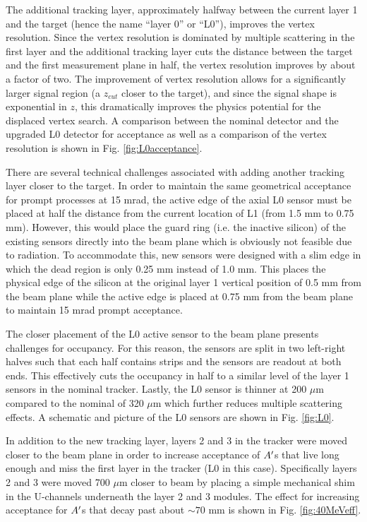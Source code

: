 The additional tracking layer, approximately halfway between the current layer 1 and the target (hence the name ``layer 0'' or ``L0''), improves the vertex resolution. Since the vertex resolution is dominated by multiple scattering in the first layer and the additional tracking layer cuts the distance between the target and the first measurement plane in half, the vertex resolution improves by about a factor of two. The improvement of vertex resolution allows for a significantly larger signal region (a $z_{cut}$ closer to the target), and since the signal shape is exponential in $z$, this dramatically improves the physics potential for the displaced vertex search. A comparison between the nominal detector and the upgraded L0 detector for acceptance as well as a comparison of the vertex resolution is shown in Fig. \ref{fig:L0acceptance}.

There are several technical challenges associated with adding another tracking layer closer to the target. In order to maintain the same geometrical acceptance for prompt processes at 15 mrad, the active edge of the axial L0 sensor must be placed at half the distance from the current location of L1 (from 1.5 mm to 0.75 mm). However, this would place the guard ring (i.e. the inactive silicon) of the existing sensors directly into the beam plane which is obviously not feasible due to radiation. To accommodate this, new sensors were designed with a slim edge in which the dead region is only 0.25 mm instead of 1.0 mm. This places the physical edge of the silicon at the original layer 1 vertical position of 0.5 mm from the beam plane while the active edge is placed at 0.75 mm from the beam plane to maintain 15 mrad prompt acceptance.

The closer placement of the L0 active sensor to the beam plane presents challenges for occupancy. For this reason, the sensors are split in two left-right halves such that each half contains strips and the sensors are readout at both ends. This effectively cuts the occupancy in half to a similar level of the layer 1 sensors in the nominal tracker. Lastly, the L0 sensor is thinner at 200 $\mu$m compared to the nominal of 320 $\mu$m which further reduces multiple scattering effects. A schematic and picture of the L0 sensors are shown in Fig. \ref{fig:L0}.

In addition to the new tracking layer, layers 2 and 3 in the tracker were moved closer to the beam plane in order to increase acceptance of $A^\prime$s that live long enough and miss the first layer in the tracker (L0 in this case). Specifically layers 2 and 3 were moved 700 $\mu$m closer to beam by placing a simple mechanical shim in the U-channels underneath the layer 2 and 3 modules. The effect for increasing acceptance for $A^\prime$s that decay past about $\sim 70$ mm is shown in Fig. \ref{fig:40MeVeff}.

